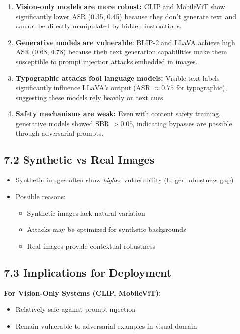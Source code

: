 \documentclass[12pt, a4paper]{article}
\begin{document}
\begin{enumerate}
    \item \textbf{Vision-only models are more robust:} CLIP and MobileViT show significantly lower ASR (0.35, 0.45) because they don't generate text and cannot be directly manipulated by hidden instructions.
    
    \item \textbf{Generative models are vulnerable:} BLIP-2 and LLaVA achieve high ASR (0.68, 0.78) because their text generation capabilities make them susceptible to prompt injection attacks embedded in images.
    
    \item \textbf{Typographic attacks fool language models:} Visible text labels significantly influence LLaVA's output (ASR $\approx 0.75$ for typographic), suggesting these models rely heavily on text cues.
    
    \item \textbf{Safety mechanisms are weak:} Even with content safety training, generative models showed SBR $> 0.05$, indicating bypasses are possible through adversarial prompts.
\end{enumerate}

\subsection{7.2 Synthetic vs Real Images}

\begin{itemize}
    \item Synthetic images often show \textit{higher} vulnerability (larger robustness gap)
    \item Possible reasons:
    \begin{itemize}
        \item Synthetic images lack natural variation
        \item Attacks may be optimized for synthetic backgrounds
        \item Real images provide contextual robustness
    \end{itemize}
\end{itemize}

\subsection{7.3 Implications for Deployment}

\textbf{For Vision-Only Systems (CLIP, MobileViT):}
\begin{itemize}
    \item Relatively safe against prompt injection
    \item Remain vulnerable to adversarial examples in visual domain
\end{itemize}
\end{document}
